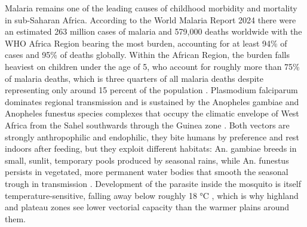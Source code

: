 \documentclass{article}
\begin{document}
Malaria remains one of the leading causes of childhood morbidity and
mortality in sub-Saharan Africa. According to the World Malaria Report
2024 \citep{who2024malaria} there were an estimated 263 million cases of
malaria and 579,000 deaths worldwide with the WHO Africa Region bearing
the most burden, accounting for at least 94\% of cases and 95\% of
deaths globally. Within the African Region, the burden falls heaviest on
children under the age of 5, who account for roughly more than 75\% of
malaria deaths, which is three quarters of all malaria deaths despite
representing only around 15 percent of the population
\citep{who2024malaria}. Plasmodium falciparum dominates regional
transmission and is sustained by the Anopheles gambiae and Anopheles
funestus species complexes that occupy the climatic envelope of West
Africa from the Sahel southwards through the Guinea zone
\citep{bhatt2015, weiss2020}. Both vectors are strongly anthropophilic
and endophilic, they bite humans by preference and rest indoors after
feeding, but they exploit different habitats: An. gambiae breeds in
small, sunlit, temporary pools produced by seasonal rains, while An.
funestus persists in vegetated, more permanent water bodies that smooth
the seasonal trough in transmission \citep{sinka2010dominant}.
Development of the parasite inside the mosquito is itself
temperature-sensitive, falling away below roughly 18 °C
\citep{gething2011modelling}, which is why highland and plateau zones
see lower vectorial capacity than the warmer plains around them.
\end{document}
